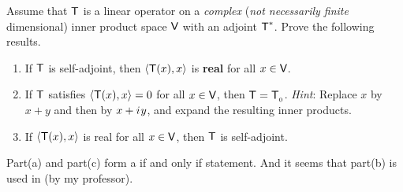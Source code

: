 \begin{exercise} \label{exercise 6.4.11}
Assume that \(\textsf{T}\) is a linear operator on a \emph{complex} (\emph{not necessarily finite} dimensional) inner product space \(\textsf{V}\) with an adjoint \(\textsf{T}^*\).
Prove the following results.
\begin{enumerate}
\item If \(\textsf{T}\) is self-adjoint, then \(\left< \textsf{T}(x), x \right>\) is \textbf{real} for all \(x \in \textsf{V}\).
\item If \(\textsf{T}\) satisfies \(\left< \textsf{T}(x), x \right> = 0\) for all \(x \in \textsf{V}\), then \(\textsf{T} = \textsf{T}_{_0}\).
\emph{Hint}: Replace \(x\) by \(x + y\) and then by \(x + {i\mkern1mu} y\), and expand the resulting inner products.
\item If \(\left< \textsf{T}(x), x \right>\) is real for all \(x \in \textsf{V}\), then \(\textsf{T}\) is self-adjoint.
\end{enumerate}
\end{exercise}

\begin{note}
Part(a) and part(c) form a if and only if statement.
And it seems that part(b) is used in  (by my professor).
\end{note}

